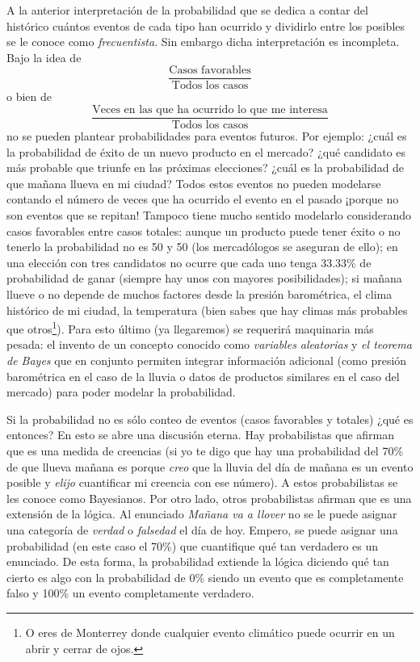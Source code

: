 \documentclass[
]{book}
\begin{document}
A la anterior interpretación de la probabilidad que se dedica a contar del histórico cuántos eventos de cada tipo han ocurrido y dividirlo entre los posibles se le conoce como \emph{frecuentista}. Sin embargo dicha interpretación es incompleta. Bajo la idea de\\
\[
\dfrac{\text{Casos favorables}}{\text{Todos los casos}}
\]
o bien de
\[
\dfrac{\text{Veces en las que ha ocurrido lo que me interesa}}{\text{Todos los casos}}
\]
no se pueden plantear probabilidades para eventos futuros. Por ejemplo: ¿cuál es la probabilidad de éxito de un nuevo producto en el mercado? ¿qué candidato es más probable que triunfe en las próximas elecciones? ¿cuál es la probabilidad de que mañana llueva en mi ciudad? Todos estos eventos no pueden modelarse contando el número de veces que ha ocurrido el evento en el pasado ¡porque no son eventos que se repitan! Tampoco tiene mucho sentido modelarlo considerando casos favorables entre casos totales: aunque un producto puede tener éxito o no tenerlo la probabilidad no es 50 y 50 (los mercadólogos se aseguran de ello); en una elección con tres candidatos no ocurre que cada uno tenga 33.33\% de probabilidad de ganar (siempre hay unos con mayores posibilidades); si mañana llueve o no depende de muchos factores desde la presión barométrica, el clima histórico de mi ciudad, la temperatura (bien sabes que hay climas más probables que otros\footnote{O eres de Monterrey donde cualquier evento climático puede ocurrir en un abrir y cerrar de ojos.}). Para esto último (ya llegaremos) se requerirá maquinaria más pesada: el invento de un concepto conocido como \emph{variables aleatorias} y \emph{el teorema de Bayes} que en conjunto permiten integrar información adicional (como presión barométrica en el caso de la lluvia o datos de productos similares en el caso del mercado) para poder modelar la probabilidad.

Si la probabilidad no es sólo conteo de eventos (casos favorables y totales) ¿qué es entonces? En esto se abre una discusión eterna. Hay probabilistas que afirman que es una medida de creencias (si yo te digo que hay una probabilidad del 70\% de que llueva mañana es porque \emph{creo} que la lluvia del día de mañana es un evento posible y \emph{elijo} cuantificar mi creencia con ese número). A estos probabilistas se les conoce como Bayesianos. Por otro lado, otros probabilistas afirman que es una extensión de la lógica. Al enunciado \emph{Mañana va a llover} no se le puede asignar una categoría de \emph{verdad} o \emph{falsedad} el día de hoy. Empero, se puede asignar una probabilidad (en este caso el 70\%) que cuantifique qué tan verdadero es un enunciado. De esta forma, la probabilidad extiende la lógica diciendo qué tan cierto es algo con la probabilidad de 0\% siendo un evento que es completamente falso y 100\% un evento completamente verdadero.
\end{document}
